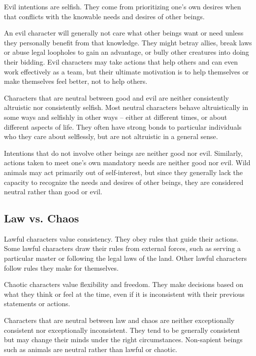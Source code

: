          Evil intentions are selfish.
        They come from prioritizing one's own desires when that conflicts with the knowable needs and desires of other beings.

        An evil character will generally not care what other beings want or need unless they personally benefit from that knowledge.
        They might betray allies, break laws or abuse legal loopholes to gain an advantage, or bully other creatures into doing their bidding.
        Evil characters may take actions that help others and can even work effectively as a team, but their ultimate motivation is to help themselves or make themselves feel better, not to help others.

         Characters that are neutral between good and evil are neither consistently altruistic nor consistently selfish.
        Most neutral characters behave altruistically in some ways and selfishly in other ways -- either at different times, or about different aspects of life.
        They often have strong bonds to particular individuals who they care about selflessly, but are not altruistic in a general sense.

        Intentions that do not involve other beings are neither good nor evil.
        Similarly, actions taken to meet one's own mandatory needs are neither good nor evil.
        Wild animals may act primarily out of self-interest, but since they generally lack the capacity to recognize the needs and desires of other beings, they are considered neutral rather than good or evil.

    \subsection{Law vs. Chaos}
         Lawful characters value consistency.
        They obey rules that guide their actions.
        Some lawful characters draw their rules from external forces, such as serving a particular master or following the legal laws of the land.
        Other lawful characters follow rules they make for themselves.

         Chaotic characters value flexibility and freedom.
        They make decisions based on what they think or feel at the time, even if it is inconsistent with their previous statements or actions.

         Characters that are neutral between law and chaos are neither exceptionally consistent nor exceptionally inconsistent.
        They tend to be generally consistent but may change their minds under the right circumstances.
        Non-sapient beings such as animals are neutral rather than lawful or chaotic.


